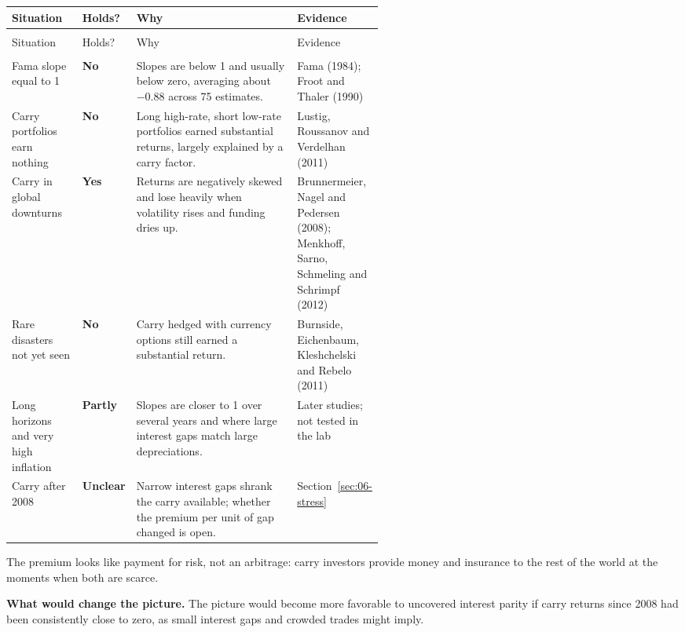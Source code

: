 {\small
\begin{longtable}{@{}>{\raggedright\arraybackslash}p{0.19\linewidth}>{\raggedright\arraybackslash}p{0.13\linewidth}>{\raggedright\arraybackslash}p{}>{\raggedright\arraybackslash}p{0.23\linewidth}@{}}
\toprule
Situation & Holds? & Why & Evidence \\
\midrule
\endfirsthead
\multicolumn{4}{@{}l}{\emph{(continued)}} \\
\toprule
Situation & Holds? & Why & Evidence \\
\midrule
\endhead
\midrule
\multicolumn{4}{r@{}}{\emph{(continued on the next page)}} \\
\endfoot
\bottomrule
\endlastfoot
Fama slope equal to 1 & \textbf{No} & Slopes are below 1 and usually below zero, averaging about $-0.88$ across 75 estimates. & Fama (1984); Froot and Thaler (1990) \\*
\addlinespace[3pt]
Carry portfolios earn nothing & \textbf{No} & Long high-rate, short low-rate portfolios earned substantial returns, largely explained by a carry factor. & Lustig, Roussanov and Verdelhan (2011) \\
\addlinespace[3pt]
Carry in global downturns & \textbf{Yes} & Returns are negatively skewed and lose heavily when volatility rises and funding dries up. & Brunnermeier, Nagel and Pedersen (2008); Menkhoff, Sarno, Schmeling and Schrimpf (2012) \\
\addlinespace[3pt]
Rare disasters not yet seen & \textbf{No} & Carry hedged with currency options still earned a substantial return. & Burnside, Eichenbaum, Kleshchelski and Rebelo (2011) \\
\addlinespace[3pt]
Long horizons and very high inflation & \textbf{Partly} & Slopes are closer to 1 over several years and where large interest gaps match large depreciations. & Later studies; not tested in the lab \\*
\addlinespace[3pt]
Carry after 2008 & \textbf{Unclear} & Narrow interest gaps shrank the carry available; whether the premium per unit of gap changed is open. & Section~\ref{sec:06-stress} \\
\end{longtable}
\addtocounter{table}{-1}%
}

The premium looks like payment for risk, not an arbitrage: carry investors provide money and insurance to the rest of the world at the moments when both are scarce.

\textbf{What would change the picture.} The picture would become more favorable to uncovered interest parity if carry returns since 2008 had been consistently close to zero, as small interest gaps and crowded trades might imply.

